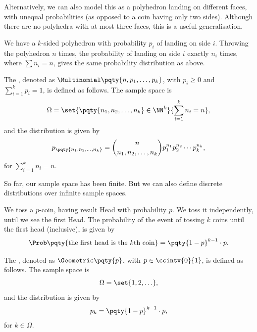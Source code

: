 Alternatively, we can also model this as a polyhedron landing on different faces, with unequal probabilities (as opposed to a coin having only two sides). Although there are no polyhedra with at most three faces, this is a useful generalisation.

\begin{example}
    \label{ex:polyhedron-different-sides}%
    We have a \(k\)-sided polyhedron with probability \(p_i\) of landing on side \(i\). Throwing the polyhedron \(n\) times, the probability of landing on side \(i\) exactly \(n_i\) times, where \(\sum n_i = n\), gives the same probability distribution as above.
\end{example}

\begin{definition}
    \label{def:multinomial-distribution}%
    The , denoted as \(\Multinomial\pqty{n, p_1, \ldots, p_k}\), with \(p_i \geq 0\) and \(\sum_{i = 1}^{k} p_i = 1\), is defined as follows. The sample space is
    \[
        \Omega = \set{\pqty{n_1, n_2, \ldots, n_k} \in \NN^k}{\sum_{i = 1}^{k} n_i = n},
    \]
    and the distribution is given by
    \[
        p_{\pqty{n_1, n_2, \ldots, n_k}} = \binom{n}{n_1, n_2, \ldots, n_k} p_1^{n_1} p_2^{n_2} \cdots p_k^{n_k},
    \]
    for \(\sum_{i = 1}^{k} n_i = n\).
\end{definition}

So far, our sample space has been finite. But we can also define discrete distributions over infinite sample spaces.

\begin{example}
    \label{ex:tossing-coins-until-head}%
    We toss a \(p\)-coin, having result Head with probability \(p\). We toss it independently, until we see the first Head. The probability of the event of tossing \(k\) coins until the first head (inclusive), is given by
    \[
        \Prob\pqty{\text{the first head is the }k\text{th coin}} = \pqty{1 - p}^{k - 1} \cdot p.
    \]
\end{example}

\begin{definition}
    \label{def:geometric-distribution}%
    The , denoted as \(\Geometric\pqty{p}\), with \(p \in \ccintv{0}{1}\), is defined as follows. The sample space is
    \[
        \Omega = \set{1, 2, \ldots},
    \]
    and the distribution is given by
    \[
        p_k = \pqty{1 - p}^{k - 1} \cdot p,
    \]
    for \(k \in \Omega\).
\end{definition}

